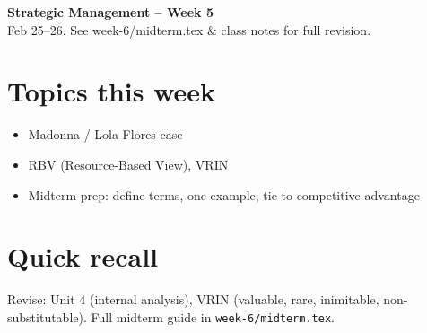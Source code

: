\documentclass[10pt,a4paper]{article}
\begin{document}
\begin{center}
{\large\bfseries\color{eublue} Strategic Management -- Week 5}\\[0.2em]
\footnotesize Feb 25--26. See week-6/midterm.tex \& class notes for full revision.
\end{center}\vspace{0.5em}

\section*{\color{eublue}Topics this week}
\begin{itemize}
\item Madonna / Lola Flores case
\item RBV (Resource-Based View), VRIN
\item Midterm prep: define terms, one example, tie to competitive advantage
\end{itemize}

\section*{Quick recall}
Revise: Unit 4 (internal analysis), VRIN (valuable, rare, inimitable, non-substitutable). Full midterm guide in \texttt{week-6/midterm.tex}.
\end{document}

